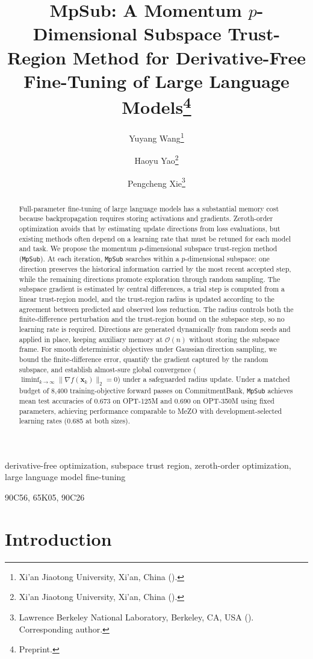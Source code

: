 \documentclass{siamart171218}
\title{MpSub: A Momentum $p$-Dimensional Subspace Trust-Region Method for Derivative-Free Fine-Tuning of Large Language Models\thanks{Preprint.}}
\author{Yuyang Wang\thanks{Xi'an Jiaotong University, Xi'an, China (\email{vibrancy05@stu.xjtu.edu.cn}).}
\and Haoyu Yao\thanks{Xi'an Jiaotong University, Xi'an, China (\email{yaohaoyu@stu.xjtu.edu.cn}).}
\and Pengcheng Xie\thanks{Lawrence Berkeley National Laboratory, Berkeley, CA, USA (\email{pxie@lbl.gov}). Corresponding author.}}
\newcommand{\bx}{\bm{x}}
\begin{document}
\maketitle

\begin{abstract}
Full-parameter fine-tuning of large language models has a substantial memory cost because backpropagation requires storing activations and gradients. Zeroth-order optimization avoids that by estimating update directions from loss evaluations, but existing methods often depend on a learning rate that must be retuned for each model and task. We propose the momentum $p$-dimensional subspace trust-region method (\texttt{MpSub}). At each iteration, \texttt{MpSub} searches within a $p$-dimensional subspace: one direction preserves the historical information carried by the most recent accepted step, while the remaining directions promote exploration through random sampling. The subspace gradient is estimated by central differences, a trial step is computed from a linear trust-region model, and the trust-region radius is updated according to the agreement between predicted and observed loss reduction. The radius controls both the finite-difference perturbation and the trust-region bound on the subspace step, so no learning rate is required. Directions are generated dynamically from random seeds and applied in place, keeping auxiliary memory at $\mathcal{O}(n)$ without storing the subspace frame. For smooth deterministic objectives under Gaussian direction sampling, we bound the finite-difference error, quantify the gradient captured by the random subspace, and establish almost-sure global convergence ($\liminf_{k\to\infty} \|\nabla f(\bx_k)\|_2 = 0$) under a safeguarded radius update. Under a matched budget of 8,400 training-objective forward passes on CommitmentBank, \texttt{MpSub} achieves mean test accuracies of 0.673 on OPT-125M and 0.690 on OPT-350M using fixed parameters, achieving performance comparable to MeZO with development-selected learning rates (0.685 at both sizes).
\end{abstract}

\begin{keywords}
derivative-free optimization, subspace trust region, zeroth-order optimization, large language model fine-tuning
\end{keywords}

\begin{AMS}
90C56, 65K05, 90C26
\end{AMS}

\section{Introduction}
\label{sec:intro}
\end{document}
